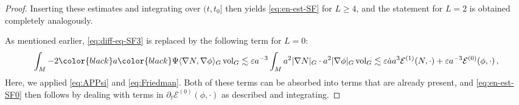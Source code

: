 \documentclass[11pt,leqno,textwidth=10cm]{amsart}
\numberwithin{equation}{section}
\theoremstyle{definition}
\theoremstyle{plain}
\newcommand{\1}{\mathbbm{1}}
\newcommand{\E}{\mathcal{E}}
\newcommand{\vol}[1]{{\text{\normalfont{vol}}}_{#1}}
\renewcommand{\epsilon}{\varepsilon}
\newcommand{\del}{\partial}
\newcommand{\Lap}{\Delta}
\newcommand{\change}[1]{\color{black}#1\color{black}}
\begin{document}
\begin{proof}
\change{Inserting }these estimates and integrating over $(t,t_0]$ then yields \eqref{eq:en-est-SF} for $L\geq 4$, and the statement for $L=2$ is obtained completely analogously.

\noindent As mentioned earlier, \eqref{eq:diff-eq-SF3} is replaced by the following term for $L=0$:
\[\int_M -2\change{a}\Psi\langle\nabla N,\nabla\phi\rangle_G\,\vol{G}\lesssim\epsilon a^{-3}\int_Ma^2\lvert\nabla N\rvert_G\cdot a^2\lvert\nabla\phi\rvert_G\,\vol{G}\lesssim \epsilon \dot{a}a^3 \E^{(1)}(N,\cdot)+\epsilon a^{-3}\E^{(0)}(\phi,\cdot)\,,\]
Here, we applied \eqref{eq:APPsi} and \eqref{eq:Friedman}. Both of these terms can be absorbed into terms that are already present, and \eqref{eq:en-est-SF0} then follows by dealing with terms in $\del_t\E^{(0)}(\phi,\cdot)$ as described and integrating. 
\end{proof}
\end{document}

